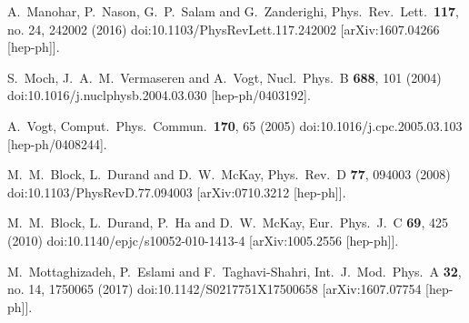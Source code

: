 \documentclass[review]{elsarticle}
\begin{document}
\begin{thebibliography}{}
    A.~Manohar, P.~Nason, G.~P.~Salam and G.~Zanderighi,
    Phys.\ Rev.\ Lett.\  {\bf 117}, no. 24, 242002 (2016)
    doi:10.1103/PhysRevLett.117.242002
    [arXiv:1607.04266 [hep-ph]].
    
    

  S.~Moch, J.~A.~M.~Vermaseren and A.~Vogt,
  Nucl.\ Phys.\ B {\bf 688}, 101 (2004)
  doi:10.1016/j.nuclphysb.2004.03.030
  [hep-ph/0403192].

  A.~Vogt,
  Comput.\ Phys.\ Commun.\  {\bf 170}, 65 (2005)
  doi:10.1016/j.cpc.2005.03.103
  [hep-ph/0408244].


  M.~M.~Block, L.~Durand and D.~W.~McKay,
  Phys.\ Rev.\ D {\bf 77}, 094003 (2008)
  doi:10.1103/PhysRevD.77.094003
  [arXiv:0710.3212 [hep-ph]].


  M.~M.~Block, L.~Durand, P.~Ha and D.~W.~McKay,
  Eur.\ Phys.\ J.\ C {\bf 69}, 425 (2010)
  doi:10.1140/epjc/s10052-010-1413-4
  [arXiv:1005.2556 [hep-ph]].


  M.~Mottaghizadeh, P.~Eslami and F.~Taghavi-Shahri,
  Int.\ J.\ Mod.\ Phys.\ A {\bf 32}, no. 14, 1750065 (2017)
  doi:10.1142/S0217751X17500658
  [arXiv:1607.07754 [hep-ph]].




\end{thebibliography}
\end{document}

